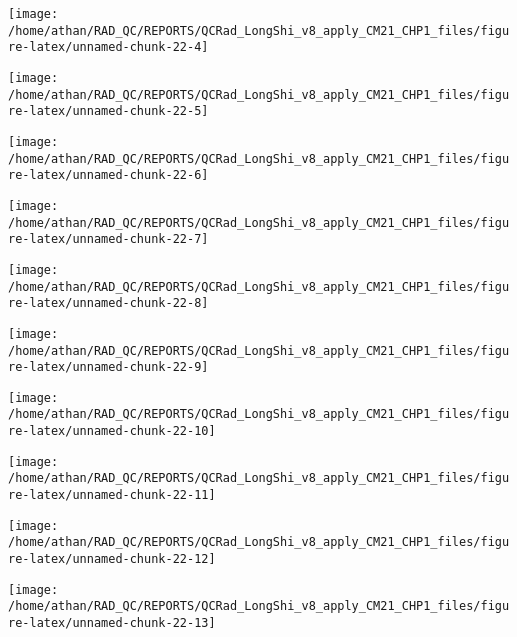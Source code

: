 \documentclass[
  10pt,
  a4paper,oneside]{article}
\begin{document}
\begin{center}\texttt{[image: /home/athan/RAD\_QC/REPORTS/QCRad\_LongShi\_v8\_apply\_CM21\_CHP1\_files/figure-latex/unnamed-chunk-22-4]} \end{center}

\begin{center}\texttt{[image: /home/athan/RAD\_QC/REPORTS/QCRad\_LongShi\_v8\_apply\_CM21\_CHP1\_files/figure-latex/unnamed-chunk-22-5]} \end{center}

\begin{center}\texttt{[image: /home/athan/RAD\_QC/REPORTS/QCRad\_LongShi\_v8\_apply\_CM21\_CHP1\_files/figure-latex/unnamed-chunk-22-6]} \end{center}

\begin{center}\texttt{[image: /home/athan/RAD\_QC/REPORTS/QCRad\_LongShi\_v8\_apply\_CM21\_CHP1\_files/figure-latex/unnamed-chunk-22-7]} \end{center}

\begin{center}\texttt{[image: /home/athan/RAD\_QC/REPORTS/QCRad\_LongShi\_v8\_apply\_CM21\_CHP1\_files/figure-latex/unnamed-chunk-22-8]} \end{center}

\begin{center}\texttt{[image: /home/athan/RAD\_QC/REPORTS/QCRad\_LongShi\_v8\_apply\_CM21\_CHP1\_files/figure-latex/unnamed-chunk-22-9]} \end{center}

\begin{center}\texttt{[image: /home/athan/RAD\_QC/REPORTS/QCRad\_LongShi\_v8\_apply\_CM21\_CHP1\_files/figure-latex/unnamed-chunk-22-10]} \end{center}

\begin{center}\texttt{[image: /home/athan/RAD\_QC/REPORTS/QCRad\_LongShi\_v8\_apply\_CM21\_CHP1\_files/figure-latex/unnamed-chunk-22-11]} \end{center}

\begin{center}\texttt{[image: /home/athan/RAD\_QC/REPORTS/QCRad\_LongShi\_v8\_apply\_CM21\_CHP1\_files/figure-latex/unnamed-chunk-22-12]} \end{center}

\begin{center}\texttt{[image: /home/athan/RAD\_QC/REPORTS/QCRad\_LongShi\_v8\_apply\_CM21\_CHP1\_files/figure-latex/unnamed-chunk-22-13]} \end{center}
\end{document}
